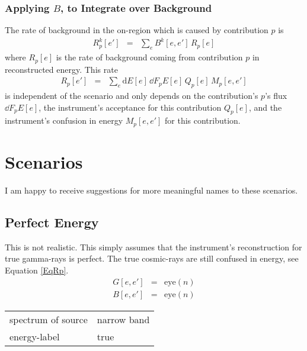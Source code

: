 \documentclass{article}%
\begin{document}
            \subsubsection*{Applying $B$, to Integrate over Background}
                The rate of background in the on-region which is caused by contribution $p$ is
                \begin{eqnarray}
                    R^k_p[e'] &=& \sum_{e} B^k[e, e'] \, R_p[e]
                \end{eqnarray}
                where $R_p[e]$ is the rate of background coming from contribution $p$ in reconstructed energy.
                This rate
                \begin{eqnarray}
                    R_p[e'] &=& \sum_{e} \text{d}E[e] \, \dd{F_p}{E}[e] \, Q_p[e] \, M_p[e, e']
                    \label{EqRp}
                \end{eqnarray}
                 is independent of the scenario and only depends on the contribution's $p$'s flux $\dd{F_p}{E}[e]$, the instrument's acceptance for this contribution $Q_p[e]$, and the instrument's confusion in energy $M_p[e, e']$ for this contribution.
    \section{Scenarios}
        I am happy to receive suggestions for more meaningful names to these scenarios.
    \subsection{Perfect Energy}
    This is not realistic. This simply assumes that the instrument's reconstruction for true gamma-rays is perfect.
    The true cosmic-rays are still confused in energy, see Equation \ref{EqRp}.
    \begin{eqnarray}
        G[e, e'] &=& \mathrm{eye}(n)
        \\
        B[e, e'] &=& \mathrm{eye}(n)
    \end{eqnarray}
    \begin{center}
        \begin{tabular}{ll}
            spectrum of source & narrow band\\
            energy-label & true\\
        \end{tabular}
    \end{center}
\end{document}
